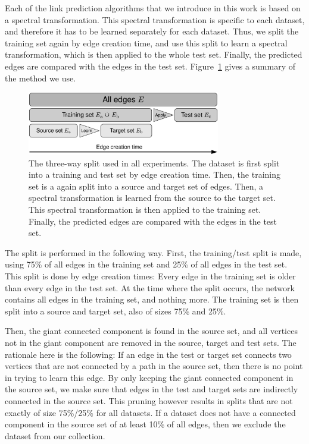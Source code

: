 \documentclass[11pt,a4paper]{book}
\newcommand{\wOnePointFive}{0.75}
\begin{document}
Each of the link prediction algorithms that we introduce in this work
is based on a spectral transformation.  This spectral transformation is
specific to each dataset, and therefore it has to be learned separately
for each dataset.  Thus, we split the training set again by edge
creation time, and use this split to learn a spectral transformation,
which is then applied to the whole test set.  
Finally, the predicted edges are compared with the edges in the test
set. 
Figure~\ref{fig:split} gives a summary of the method we use.

\begin{figure}[h!]
  \centering
  \includegraphics[width=\wOnePointFive\textwidth]{img-pdf/split}
  \caption{
    The three-way split used in all experiments.  The dataset is first split
    into a training and test set by edge creation time.  Then, the
    training set is a again split into a source and target set of
    edges.  Then, a spectral transformation is learned from the source
    to the target set.  This spectral transformation is then applied to
    the training set.  Finally, the predicted edges are compared with
    the edges in the test set. 
  }
  \label{fig:split}
\end{figure}

The split is performed in the following way. First, the training/test
split is made, using 75\% of all edges in the training set and 25\% of
all edges in the test set.  This split is done by edge creation times:
Every edge in the training set is older than every edge in the test
set.  At the time where the split occurs, the network contains all
edges in the training set, and nothing more.  
The training set is then split into a source and target set, also of
sizes 75\% and 25\%. 

Then, the giant connected component is found in the source set, and all
vertices not in the giant component are removed in the source, target
and test sets.  The rationale here is the following:  If an
edge in the test or target set connects two vertices that are not connected by a
path in the
source set, then there is no point in trying to learn this edge.  By
only keeping the giant connected component in the source set, we make
sure that edges in the test and target sets are indirectly connected in
the source
set. This pruning however results in splits that are not
exactly of size 75\%/25\% for all datasets.  If a dataset does not have a
connected component in the source set of at least 10\% of all edges,
then we exclude the dataset from our collection. 
\end{document}
